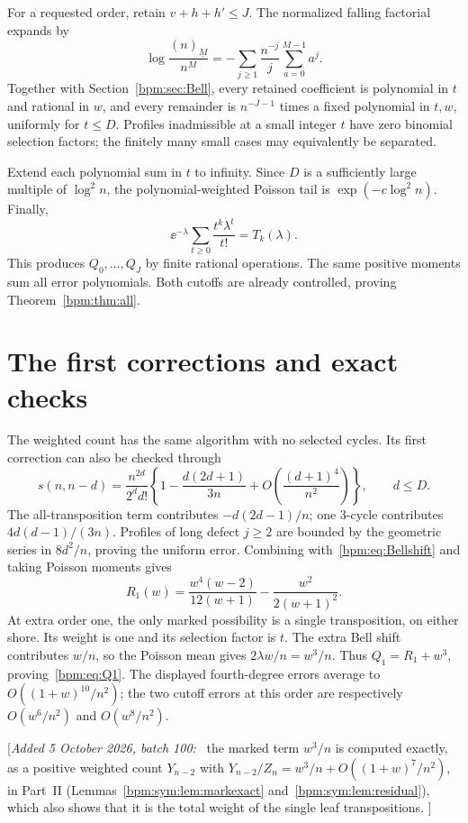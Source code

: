 \documentclass[11pt,a4paper]{article}
\theoremstyle{remark}\newtheorem{remark}[theorem]{Remark}%
\newcommand{\fall}[2]{(#1)_{\underline{#2}}}\newcommand{\rise}[2]{(#1)^{\overline{#2}}}
\newenvironment{writenote}{\par\smallskip\noindent\small[\textit{Added 5 October 2026, batch 100:}\ }{]\par\smallskip}
\begin{document}
For a requested order, retain $v+h+h'\le J$. The normalized falling factorial expands by
\[
 \log\frac{\fall nM}{n^M}
 =-\sum_{j\ge1}\frac{n^{-j}}j\sum_{a=0}^{M-1}a^j.
\]
Together with Section~\ref{bpm:sec:Bell}, every retained coefficient is polynomial in $t$ and rational in $w$, and every remainder is $n^{-J-1}$ times a fixed polynomial in $t,w$, uniformly for $t\le D$. Profiles inadmissible at a small integer $t$ have zero binomial selection factors; the finitely many small cases may equivalently be separated.

Extend each polynomial sum in $t$ to infinity. Since $D$ is a sufficiently large multiple of $\log^2n$, the polynomial-weighted Poisson tail is $\exp(-c\log^2n)$. Finally,
\begin{equation}\label{bpm:eq:Poisson}
 \ee^{-\lambda}\sum_{t\ge0}\frac{t^k\lambda^t}{t!}=T_k(\lambda).
\end{equation}
This produces $Q_0,\ldots,Q_J$ by finite rational operations. The same positive moments sum all error polynomials. Both cutoffs are already controlled, proving Theorem~\ref{bpm:thm:all}.

\section{The first corrections and exact checks}\label{bpm:sec:checks}
The weighted count has the same algorithm with no selected cycles. Its first correction can also be checked through
\[
 s(n,n-d)=\frac{n^{2d}}{2^d d!}
 \left\{1-\frac{d(2d+1)}{3n}
       +O\!\left(\frac{(d+1)^4}{n^2}\right)\right\},\qquad d\le D.
\]
The all-transposition term contributes $-d(2d-1)/n$; one 3-cycle contributes $4d(d-1)/(3n)$. Profiles of long defect $j\ge2$ are bounded by the geometric series in $8d^2/n$, proving the uniform error. Combining with~\eqref{bpm:eq:Bellshift} and taking Poisson moments gives
\begin{equation}\label{bpm:eq:R1}
 R_1(w)=\frac{w^4(w-2)}{12(w+1)}-\frac{w^2}{2(w+1)^2}.
\end{equation}
At extra order one, the only marked possibility is a single transposition, on either shore. Its weight is one and its selection factor is $t$. The extra Bell shift contributes $w/n$, so the Poisson mean gives $2\lambda w/n=w^3/n$. Thus $Q_1=R_1+w^3$, proving~\eqref{bpm:eq:Q1}.
The displayed fourth-degree errors average to $O((1+w)^{10}/n^2)$; the two cutoff errors at this order are respectively $O(w^6/n^2)$ and $O(w^8/n^2)$.

\begin{writenote}
the marked term $w^3/n$ is computed exactly, as a positive weighted count
$Y_{n-2}$ with $Y_{n-2}/Z_n=w^3/n+O((1+w)^7/n^2)$, in Part~II
(Lemmas~\ref{bpm:sym:lem:markexact} and~\ref{bpm:sym:lem:residual}), which
also shows that it is the total weight of the single leaf transpositions.
\end{writenote}
\end{document}
